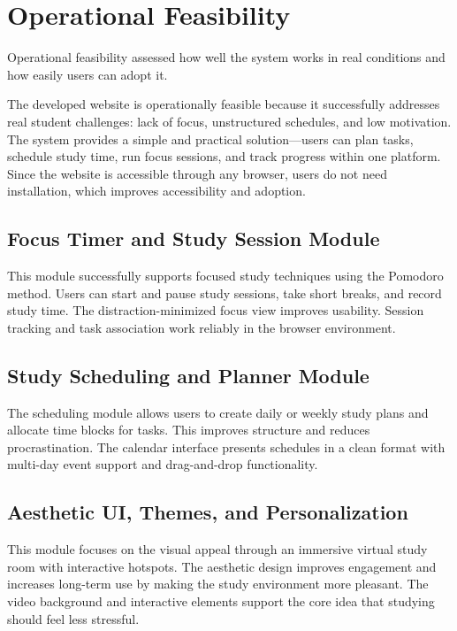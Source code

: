         \section{Operational Feasibility}
           Operational feasibility assessed how well the system works in real conditions and how easily users can adopt it.

            The developed website is operationally feasible because it successfully addresses real student challenges: lack of focus, unstructured schedules, and low motivation. The system provides a simple and practical solution---users can plan tasks, schedule study time, run focus sessions, and track progress within one platform. Since the website is accessible through any browser, users do not need installation, which improves accessibility and adoption.

           \subsection{Focus Timer and Study Session Module}
                This module successfully supports focused study techniques using the Pomodoro method. Users can start and pause study sessions, take short breaks, and record study time. The distraction-minimized focus view improves usability. Session tracking and task association work reliably in the browser environment.

           \subsection{Study Scheduling and Planner Module}
               The scheduling module allows users to create daily or weekly study plans and allocate time blocks for tasks. This improves structure and reduces procrastination. The calendar interface presents schedules in a clean format with multi-day event support and drag-and-drop functionality.

            \subsection{Aesthetic UI, Themes, and Personalization}
                This module focuses on the visual appeal through an immersive virtual study room with interactive hotspots. The aesthetic design improves engagement and increases long-term use by making the study environment more pleasant. The video background and interactive elements support the core idea that studying should feel less stressful.

